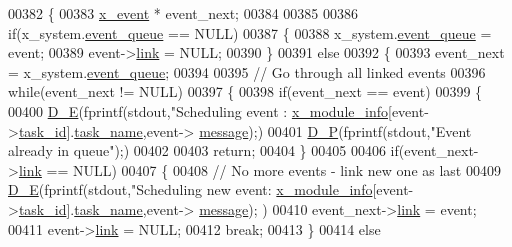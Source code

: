 \begin{DoxyCode}
{{{00382 \{
00383     \hyperlink{a00036_de/d37/a00849}{x\_event} *    event\_next;
00384 
00385 
00386     \textcolor{keywordflow}{if}(x\_system.\hyperlink{a00037_aae3e0af6b968bca8cea3ebff4b8918cb}{event\_queue} == NULL)
00387     \{
00388         x\_system.\hyperlink{a00037_aae3e0af6b968bca8cea3ebff4b8918cb}{event\_queue} = event;
00389         \textcolor{keyword}{event}->\hyperlink{a00036_aab03e4ec45a7b861ab6ed51f64f58fda}{link} = NULL;
00390     \}
00391     \textcolor{keywordflow}{else}
00392     \{
00393         event\_next = x\_system.\hyperlink{a00037_aae3e0af6b968bca8cea3ebff4b8918cb}{event\_queue};
00394 
00395         \textcolor{comment}{// Go through all linked events}
00396         \textcolor{keywordflow}{while}(event\_next != NULL)
00397         \{
00398             \textcolor{keywordflow}{if}(event\_next == event)
00399             \{
00400                 \hyperlink{a00040_ae8251f649f2077b9d0de5a10e6c2cf79}{D\_E}(fprintf(stdout,\textcolor{stringliteral}{"Scheduling event :%
      \hyperlink{a00037_a6724d1e1430a0e89c134b30152988385}{x\_module\_info}[event->\hyperlink{a00036_a21b41e494a28583d4da10f1afb1c5328}{task\_id}].\hyperlink{a00037_a530a0539bc1522a85f661b6e1c9ebebd}{task\_name},event->
      \hyperlink{a00036_adf9665938515a20c283eea2c978cf80d}{message});)
00401                 \hyperlink{a00040_aaa56ed691cef86e8de0c4e90e47f2e5d}{D\_P}(fprintf(stdout,\textcolor{stringliteral}{"Event already in queue"});)
00402                 
00403                 \textcolor{keywordflow}{return};
00404             \}
00405 
00406             \textcolor{keywordflow}{if}(event\_next->\hyperlink{a00036_aab03e4ec45a7b861ab6ed51f64f58fda}{link}  == NULL)
00407             \{
00408                 \textcolor{comment}{// No more events - link new one as last}
00409                 \hyperlink{a00040_ae8251f649f2077b9d0de5a10e6c2cf79}{D\_E}(fprintf(stdout,\textcolor{stringliteral}{"Scheduling new event:%
      \hyperlink{a00037_a6724d1e1430a0e89c134b30152988385}{x\_module\_info}[event->\hyperlink{a00036_a21b41e494a28583d4da10f1afb1c5328}{task\_id}].\hyperlink{a00037_a530a0539bc1522a85f661b6e1c9ebebd}{task\_name},event->
      \hyperlink{a00036_adf9665938515a20c283eea2c978cf80d}{message});    )
00410                 event\_next->\hyperlink{a00036_aab03e4ec45a7b861ab6ed51f64f58fda}{link} = event;
00411                 \textcolor{keyword}{event}->\hyperlink{a00036_aab03e4ec45a7b861ab6ed51f64f58fda}{link} = NULL;
00412                 \textcolor{keywordflow}{break};
00413             \}
00414             \textcolor{keywordflow}{else}
}}}}}
\end{DoxyCode}

